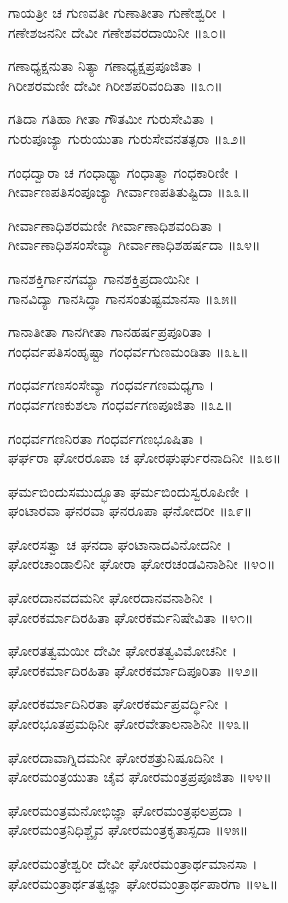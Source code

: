 ಗಾಯತ್ರೀ ಚ ಗುಣವತೀ ಗುಣಾತೀತಾ ಗುಣೇಶ್ವರೀ ।\\
ಗಣೇಶಜನನೀ ದೇವೀ ಗಣೇಶವರದಾಯಿನೀ ॥೩೦॥

ಗಣಾಧ್ಯಕ್ಷನುತಾ ನಿತ್ಯಾ ಗಣಾಧ್ಯಕ್ಷಪ್ರಪೂಜಿತಾ ।\\
ಗಿರೀಶರಮಣೀ ದೇವೀ ಗಿರೀಶಪರಿವಂದಿತಾ ॥೩೧॥

ಗತಿದಾ ಗತಿಹಾ ಗೀತಾ ಗೌತಮೀ ಗುರುಸೇವಿತಾ ।\\
ಗುರುಪೂಜ್ಯಾ ಗುರುಯುತಾ ಗುರುಸೇವನತತ್ಪರಾ ॥೩೨॥

ಗಂಧದ್ವಾರಾ ಚ ಗಂಧಾಢ್ಯಾ ಗಂಧಾತ್ಮಾ ಗಂಧಕಾರಿಣೀ ।\\
ಗೀರ್ವಾಣಪತಿಸಂಪೂಜ್ಯಾ ಗೀರ್ವಾಣಪತಿತುಷ್ಟಿದಾ ॥೩೩॥

ಗೀರ್ವಾಣಾಧಿಶರಮಣೀ ಗೀರ್ವಾಣಾಧಿಶವಂದಿತಾ ।\\
ಗೀರ್ವಾಣಾಧಿಶಸಂಸೇವ್ಯಾ ಗೀರ್ವಾಣಾಧಿಶಹರ್ಷದಾ ॥೩೪॥

ಗಾನಶಕ್ತಿರ್ಗಾನಗಮ್ಯಾ ಗಾನಶಕ್ತಿಪ್ರದಾಯಿನೀ ।\\
ಗಾನವಿದ್ಯಾ ಗಾನಸಿದ್ಧಾ ಗಾನಸಂತುಷ್ಟಮಾನಸಾ ॥೩೫॥

ಗಾನಾತೀತಾ ಗಾನಗೀತಾ ಗಾನಹರ್ಷಪ್ರಪೂರಿತಾ ।\\
ಗಂಧರ್ವಪತಿಸಂಹೃಷ್ಟಾ ಗಂಧರ್ವಗುಣಮಂಡಿತಾ ॥೩೬॥

ಗಂಧರ್ವಗಣಸಂಸೇವ್ಯಾ ಗಂಧರ್ವಗಣಮಧ್ಯಗಾ ।\\
ಗಂಧರ್ವಗಣಕುಶಲಾ ಗಂಧರ್ವಗಣಪೂಜಿತಾ ॥೩೭॥

ಗಂಧರ್ವಗಣನಿರತಾ ಗಂಧರ್ವಗಣಭೂಷಿತಾ ।\\
ಘರ್ಘರಾ ಘೋರರೂಪಾ ಚ ಘೋರಘುರ್ಘುರನಾದಿನೀ ॥೩೮॥

ಘರ್ಮಬಿಂದುಸಮುದ್ಭೂತಾ ಘರ್ಮಬಿಂದುಸ್ವರೂಪಿಣೀ ।\\
ಘಂಟಾರವಾ ಘನರವಾ ಘನರೂಪಾ ಘನೋದರೀ ॥೩೯॥

ಘೋರಸತ್ವಾ ಚ ಘನದಾ ಘಂಟಾನಾದವಿನೋದನೀ ।\\
ಘೋರಚಾಂಡಾಲಿನೀ ಘೋರಾ ಘೋರಚಂಡವಿನಾಶಿನೀ ॥೪೦॥

ಘೋರದಾನವದಮನೀ ಘೋರದಾನವನಾಶಿನೀ ।\\
ಘೋರಕರ್ಮಾದಿರಹಿತಾ ಘೋರಕರ್ಮನಿಷೇವಿತಾ ॥೪೧॥

ಘೋರತತ್ವಮಯೀ ದೇವೀ ಘೋರತತ್ವವಿಮೋಚನೀ ।\\
ಘೋರಕರ್ಮಾದಿರಹಿತಾ ಘೋರಕರ್ಮಾದಿಪೂರಿತಾ ॥೪೨॥

ಘೋರಕರ್ಮಾದಿನಿರತಾ ಘೋರಕರ್ಮಪ್ರವರ್ದ್ಧಿನೀ ।\\
ಘೋರಭೂತಪ್ರಮಥಿನೀ ಘೋರವೇತಾಲನಾಶಿನೀ ॥೪೩॥

ಘೋರದಾವಾಗ್ನಿದಮನೀ ಘೋರಶತ್ರುನಿಷೂದಿನೀ ।\\
ಘೋರಮಂತ್ರಯುತಾ ಚೈವ ಘೋರಮಂತ್ರಪ್ರಪೂಜಿತಾ ॥೪೪॥

ಘೋರಮಂತ್ರಮನೋಭಿಜ್ಞಾ ಘೋರಮಂತ್ರಫಲಪ್ರದಾ ।\\
ಘೋರಮಂತ್ರನಿಧಿಶ್ಚೈವ ಘೋರಮಂತ್ರಕೃತಾಸ್ಪದಾ ॥೪೫॥

ಘೋರಮಂತ್ರೇಶ್ವರೀ ದೇವೀ ಘೋರಮಂತ್ರಾರ್ಥಮಾನಸಾ ।\\
ಘೋರಮಂತ್ರಾರ್ಥತತ್ವಜ್ಞಾ ಘೋರಮಂತ್ರಾರ್ಥಪಾರಗಾ ॥೪೬॥

